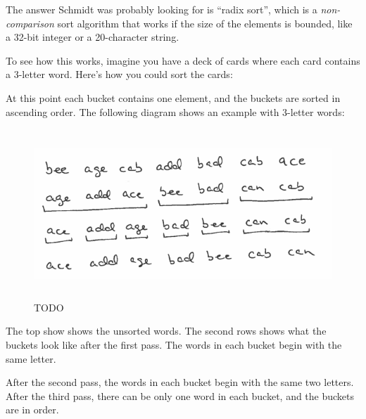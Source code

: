 \documentclass[12pt]{book}
\theoremstyle{exercise}
\newcommand{\java}{\verb}%}
\begin{document}
{{{The answer Schmidt was probably looking for is ``radix sort'', which is
a \emph{non-comparison} sort algorithm that works if the size of the
elements is bounded, like a 32-bit integer or a 20-character string.

To see how this works, imagine you have a deck of cards where each card
contains a 3-letter word. Here's how you could sort the cards:


At this point each bucket contains one element, and the buckets are
sorted in ascending order. The following diagram shows an example with
3-letter words:

\begin{figure}
\centering
\includegraphics[height=2.5in]{figs/figure3.png}
\caption{TODO}
\end{figure}

The top show shows the unsorted words. The second rows shows what the
buckets look like after the first pass. The words in each bucket begin
with the same letter.

After the second pass, the words in each bucket begin with the same two
letters. After the third pass, there can be only one word in each
bucket, and the buckets are in order.

}}}
\end{document}
